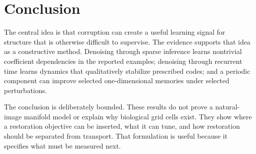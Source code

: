 \section{Conclusion}
\label{sec:synthesis-conclusion}

The central idea is that corruption can create a useful learning signal for structure that is otherwise difficult to supervise. The evidence supports that idea as a constructive method. Denoising through sparse inference learns nontrivial coefficient dependencies in the reported examples; denoising through recurrent time learns dynamics that qualitatively stabilize prescribed codes; and a periodic component can improve selected one-dimensional memories under selected perturbations.

The conclusion is deliberately bounded. These results do not prove a natural-image manifold model or explain why biological grid cells exist. They show where a restoration objective can be inserted, what it can tune, and how restoration should be separated from transport. That formulation is useful because it specifies what must be measured next.
